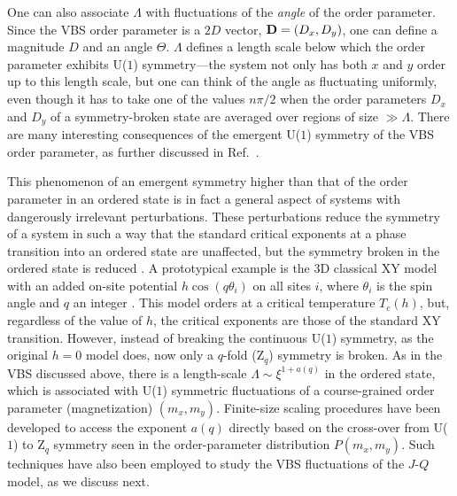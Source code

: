 \documentclass[range]{ar2e}
\begin{document}
One can also associate $\Lambda$ with fluctuations of the {\it angle} of the order parameter. Since the VBS order parameter is a $2D$ vector, ${\bf D}= (D_x,D_y)$, 
one can define a magnitude $D$ and an angle $\Theta$. $\Lambda$ defines a length scale below which the order parameter exhibits U($1$) symmetry---the system
not only has both $x$ and $y$ order up to this length scale, but one can think of the angle as fluctuating uniformly, even though it has to take one of the 
values $n\pi/2$ when the order parameters $D_x$ and $D_y$ of a symmetry-broken state are averaged over regions of size $\gg \Lambda$. There are many interesting 
consequences of the emergent U($1$) symmetry of the VBS order parameter, as further discussed in Ref.~\cite{Sandvik12}.

This phenomenon of an emergent symmetry higher than that of the order parameter in an ordered state is in fact a general aspect of systems with 
dangerously irrelevant perturbations. These perturbations reduce the symmetry of a system in such a way that the standard critical exponents 
at a phase transition into an ordered state are unaffected, but the symmetry broken in the ordered state is reduced \cite{Jose77,Oshikawa00}. A 
prototypical example is the 3D classical XY model with an added on-site potential $h\cos(q\theta_i)$ on all sites $i$, where $\theta_i$ is the spin 
angle and $q$ an integer \cite{Carmona00}. This model orders at a critical temperature $T_c(h)$, but, regardless of the value of $h$, the critical exponents 
are those of the standard XY transition. However, instead of breaking the continuous U($1$) symmetry, as the original $h=0$ model does, 
now only a $q$-fold (Z$_q$) symmetry is broken. As in the VBS discussed above, there is a length-scale $\Lambda \sim \xi^{1+a(q)}$ in the ordered state, which 
is associated with U($1$) symmetric fluctuations of a course-grained order parameter (magnetization) $(m_x,m_y)$. Finite-size scaling procedures have been 
developed \cite{Lou07} to access the exponent $a(q)$ directly based on the cross-over from U($1$) to Z$_q$ symmetry seen in the order-parameter distribution 
$P(m_x,m_y)$. Such techniques have also been employed to study the VBS fluctuations of the $J$-$Q$ model, as we discuss next.
\end{document}
